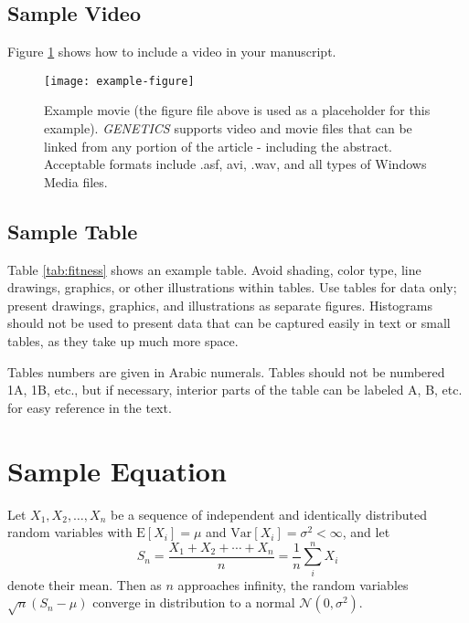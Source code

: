 \documentclass[9pt,twocolumn,twoside,lineno]{gsajnl}
\begin{document}
\subsection{Sample Video}

Figure \ref{video:spectrum} shows how to include a video in your manuscript.

\begin{figure}[htbp]
\centering
\texttt{[image: example-figure]}
\caption{Example movie (the figure file above is used as a placeholder for this example). \textit{GENETICS} supports video and movie files that can be linked from any portion of the article - including the abstract. Acceptable formats include .asf, avi, .wav, and all types of Windows Media files.   
}%
\label{video:spectrum}
\end{figure}


\subsection{Sample Table}

Table \ref{tab:fitness} shows an example table. Avoid shading, color type, line drawings, graphics, or other illustrations within tables. Use tables for data only; present drawings, graphics, and illustrations as separate figures. Histograms should not be used to present data that can be captured easily in text or small tables, as they take up much more space.  

Tables numbers are given in Arabic numerals. Tables should not be numbered 1A, 1B, etc., but if necessary, interior parts of the table can be labeled A, B, etc. for easy reference in the text.  



\section{Sample Equation}

Let $X_1, X_2, \ldots, X_n$ be a sequence of independent and identically distributed random variables with $\text{E}[X_i] = \mu$ and $\text{Var}[X_i] = \sigma^2 < \infty$, and let
\begin{equation}
S_n = \frac{X_1 + X_2 + \cdots + X_n}{n}
      = \frac{1}{n}\sum_{i}^{n} X_i
\label{eq:refname1}
\end{equation}
denote their mean. Then as $n$ approaches infinity, the random variables $\sqrt{n}(S_n - \mu)$ converge in distribution to a normal $\mathcal{N}(0, \sigma^2)$.


\end{document}
